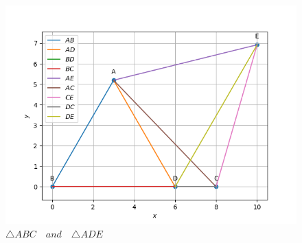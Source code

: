 \begin{enumerate}[label=\thesection.\arabic*,ref=\thesection.\theenumi]
\begin{enumerate}[label=(\roman*)]
\begin{figure}[H]
    \includegraphics[width=\columnwidth]{figs/Final_python.png}
	\caption{$\triangle ABC \hspace{12pt} and \hspace{12pt} \triangle ADE$}
    \label{fig:fig2}
\end{figure}
\end{enumerate}
\end{enumerate}

